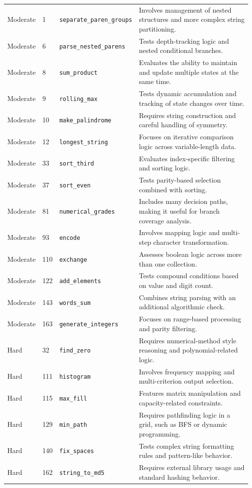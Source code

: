 \documentclass[journal]{IEEEtran}
\begin{document}
\begin{table}[!t]
\begin{tabular}{p{}p{}p{}p{}}
Moderate & 1 & \texttt{separate\_paren\_groups} & Involves management of nested structures and more complex string partitioning. \\
Moderate & 6 & \texttt{parse\_nested\_parens} & Tests depth-tracking logic and nested conditional branches. \\
Moderate & 8 & \texttt{sum\_product} & Evaluates the ability to maintain and update multiple states at the same time. \\
Moderate & 9 & \texttt{rolling\_max} & Tests dynamic accumulation and tracking of state changes over time. \\
Moderate & 10 & \texttt{make\_palindrome} & Requires string construction and careful handling of symmetry. \\
Moderate & 12 & \texttt{longest\_string} & Focuses on iterative comparison logic across variable-length data. \\
Moderate & 33 & \texttt{sort\_third} & Evaluates index-specific filtering and sorting logic. \\
Moderate & 37 & \texttt{sort\_even} & Tests parity-based selection combined with sorting. \\
Moderate & 81 & \texttt{numerical\_grades} & Includes many decision paths, making it useful for branch coverage analysis. \\
Moderate & 93 & \texttt{encode} & Involves mapping logic and multi-step character transformation. \\
Moderate & 110 & \texttt{exchange} & Assesses boolean logic across more than one collection. \\
Moderate & 122 & \texttt{add\_elements} & Tests compound conditions based on value and digit count. \\
Moderate & 143 & \texttt{words\_sum} & Combines string parsing with an additional algorithmic check. \\
Moderate & 163 & \texttt{generate\_integers} & Focuses on range-based processing and parity filtering. \\

\midrule

Hard & 32 & \texttt{find\_zero} & Requires numerical-method style reasoning and polynomial-related logic. \\
Hard & 111 & \texttt{histogram} & Involves frequency mapping and multi-criterion output selection. \\
Hard & 115 & \texttt{max\_fill} & Features matrix manipulation and capacity-related constraints. \\
Hard & 129 & \texttt{min\_path} & Requires pathfinding logic in a grid, such as BFS or dynamic programming. \\
Hard & 140 & \texttt{fix\_spaces} & Tests complex string formatting rules and pattern-like behavior. \\
Hard & 162 & \texttt{string\_to\_md5} & Requires external library usage and standard hashing behavior. \\

\bottomrule
\end{tabular}
\end{table}
\end{document}
